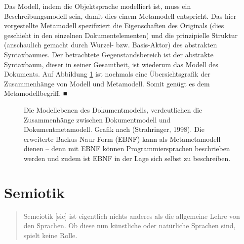  
Das Modell, indem die Objektsprache modelliert ist, muss ein Beschreibungsmodell sein, damit dies einem Metamodell entspricht. Das hier vorgestellte Metamodell spezifiziert die Eigenschaften des Originals (dies geschieht in den einzelnen Dokumentelementen) und die prinzipielle Struktur (anschaulich gemacht durch Wurzel- bzw. Basis-Aktor) des abstrakten Syntaxbaumes. Der betrachtete Gegenstandsbereich ist der abstrakte Syntaxbaum, dieser in seiner Gesamtheit, ist wiederum das Modell des Dokuments. Auf Abbildung \ref{metamodellschema} ist nochmals eine Übersichtsgrafik der Zusammenhänge von Modell und Metamodell. Somit genügt es dem Metamodellbegriff. ■

 
\begin{figure}[h!]
\centering
{}
\caption[Modellebenen des Dokumentmodells]{ Die Modellebenen des Dokumentmodells, verdeutlichen die Zusammenhänge zwischen Dokumentmodell und Dokumentmetamodell. Grafik nach (Strahringer, 1998). Die erweiterte Backus-Naur-Form (EBNF) kann als Metametamodell dienen -- denn mit EBNF können Programmiersprachen beschrieben werden und zudem ist EBNF in der Lage sich selbst zu beschreiben. }\label{metamodellschema}
\end{figure}
 
\section{Semiotik}\label{semiotik-sec}
 
\begin{quote}
 Semeiotik [sic] ist eigentlich nichts anderes als die allgemeine Lehre von den Sprachen. Ob diese nun künstliche oder natürliche Sprachen sind, spielt keine Rolle. \citep[S.~8]{Malissa}
\end{quote}
 

